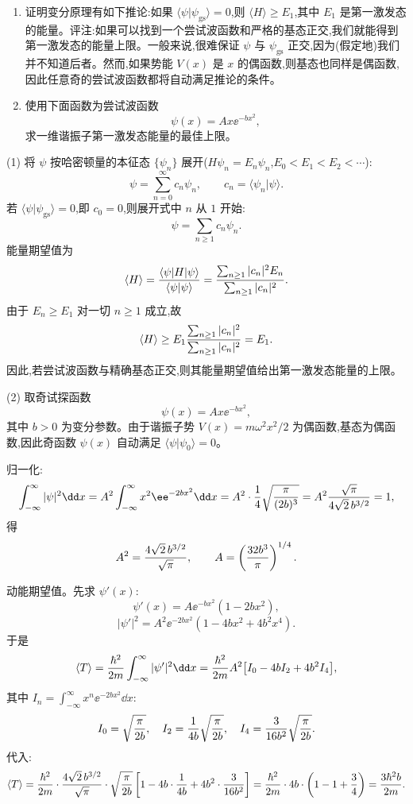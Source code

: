\begin{question}
\begin{enumerate}
\item 证明变分原理有如下推论:如果 $\langle\psi|\psi_{\mathrm{gs}}\rangle=0$,则 $\langle H\rangle\ge E_1$,其中 $E_1$ 是第一激发态的能量。评注:如果可以找到一个尝试波函数和严格的基态正交,我们就能得到第一激发态的能量上限。一般来说,很难保证 $\psi$ 与 $\psi_{\mathrm{gs}}$ 正交,因为(假定地)我们并不知道后者。然而,如果势能 $V(x)$ 是 $x$ 的偶函数,则基态也同样是偶函数,因此任意奇的尝试波函数都将自动满足推论的条件。
\item 使用下面函数为尝试波函数
\[
\psi(x)=Ax\ee^{-b x^2},
\]
求一维谐振子第一激发态能量的最佳上限。
\end{enumerate}
\begin{solution}
(1) 将 $\psi$ 按哈密顿量的本征态 $\{\psi_n\}$ 展开($H\psi_n=E_n\psi_n$,$E_0<E_1<E_2<\cdots$):
\[
\psi=\sum_{n=0}^\infty c_n\psi_n,\qquad c_n=\langle\psi_n|\psi\rangle.
\]
若 $\langle\psi|\psi_{\mathrm{gs}}\rangle=0$,即 $c_0=0$,则展开式中 $n$ 从 $1$ 开始:
\[
\psi=\sum_{n\ge1}c_n\psi_n.
\]
能量期望值为
\[
\langle H\rangle={\langle\psi|H|\psi\rangle\over\langle\psi|\psi\rangle}
={\sum_{n\ge1}|c_n|^2E_n\over\sum_{n\ge1}|c_n|^2}.
\]
由于 $E_n\ge E_1$ 对一切 $n\ge1$ 成立,故
\[
\langle H\rangle\ge E_1{\sum_{n\ge1}|c_n|^2\over\sum_{n\ge1}|c_n|^2}=E_1.
\]
因此,若尝试波函数与精确基态正交,则其能量期望值给出第一激发态能量的上限。

(2) 取奇试探函数
\[
\psi(x)=Ax\ee^{-bx^2},
\]
其中 $b>0$ 为变分参数。由于谐振子势 $V(x)=m\omega^2x^2/2$ 为偶函数,基态为偶函数,因此奇函数 $\psi(x)$ 自动满足 $\langle\psi|\psi_0\rangle=0$。

归一化:
\[
\int_{-\infty}^\infty|\psi|^2\dd x
=A^2\int_{-\infty}^\infty x^2\ee^{-2bx^2}\dd x
=A^2\cdot{1\over4}\sqrt{\pi\over(2b)^3}
=A^2{\sqrt\pi\over4\sqrt2\,b^{3/2}}=1,
\]
得
\[
A^2={4\sqrt2\,b^{3/2}\over\sqrt\pi},\qquad
A=\left({32b^3\over\pi}\right)^{1/4}.
\]

动能期望值。先求 $\psi'(x)$:
\[
\psi'(x)=A\ee^{-bx^2}(1-2bx^2),
\]
\[
|\psi'|^2=A^2\ee^{-2bx^2}(1-4bx^2+4b^2x^4).
\]
于是
\[
\langle T\rangle={\hbar^2\over2m}\int_{-\infty}^\infty|\psi'|^2\dd x
={\hbar^2\over2m}A^2\bigl[I_0-4bI_2+4b^2I_4\bigr],
\]
其中 $I_n=\int_{-\infty}^\infty x^n \ee^{-2bx^2}\dd x$:
\[
I_0=\sqrt{\pi\over2b},\quad
I_2={1\over4b}\sqrt{\pi\over2b},\quad
I_4={3\over16b^2}\sqrt{\pi\over2b}.
\]
代入:
\[
\langle T\rangle={\hbar^2\over2m}\cdot{4\sqrt2\,b^{3/2}\over\sqrt\pi}
\cdot\sqrt{\pi\over2b}\left[1-4b\cdot{1\over4b}+4b^2\cdot{3\over16b^2}\right]
={\hbar^2\over2m}\cdot4b\cdot\left(1-1+{3\over4}\right)
={3\hbar^2b\over2m}.
\]


\end{solution}
\end{question}

